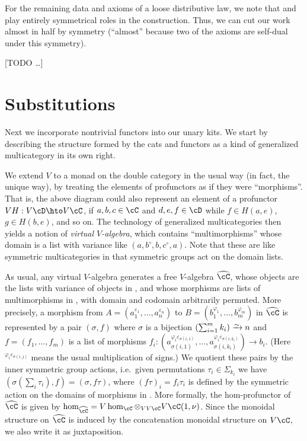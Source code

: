 \documentclass{amsart}
\newcommand{\C}{\cC}
\newcommand{\D}{\cD}
\renewcommand{\Chat}{\ensuremath{\widehat{\C}}\xspace}
\newcommand{\Tmult}{\nu}
\renewcommand{\o}{^{\circ}}
\newcommand{\e}[1][]{^{\varepsilon_{#1}}}
\renewcommand{\ph}[1][]{^{\varphi_{#1}}}
\newcommand{\phe}[2]{^{\varphi_{#1}\varepsilon_{#2}}}
\begin{document}
For the remaining data and axioms of a loose distributive law, we note that \dT and \dS play entirely symmetrical roles in the construction.
Thus, we can cut our work almost in half by symmetry (``almost'' because two of the axioms are self-dual under this symmetry).

[TODO \dots]


\section{Substitutions}
\label{sec:substitutions}

Next we incorporate nontrivial functors into our unary kits.
We start by describing the structure formed by the cats and functors as a kind of generalized multicategory in its own right.

We extend $V$ to a monad on the double category \dCat in the usual way (in fact, the unique way), by treating the elements of profunctors as if they were ``morphisms''.
That is, the above diagram could also represent an element of a profunctor $V H : V \D \hto V \C$, if $a,b,c\in\C$ and $d,e,f\in \D$ while $f\in H(a,e)$, $g\in H(b,e)$, and so on.
The technology of generalized multicategories then yields a notion of \emph{virtual $V$-algebra}, which contains ``multimorphisms'' whose domain is a list with variance like $(a,b\o,b,c\o,a)$.
Note that these are like symmetric multicategories in that symmetric groups act on the domain lists.

As usual, any virtual $V$-algebra \C generates a free $V$-algebra \Chat, whose objects are the lists with variance of objects in \C, and whose morphisms are lists of multimorphisms in \C, with domain and codomain arbitrarily permuted.
More precisely, a morphism from $A=(a_1\e[1],\dots,a_n\e[n])$ to $B=(b_1\ph[1],\dots,b_m\ph[m])$ in \Chat is represented by a pair $(\sigma,f)$ where $\sigma$ is a bijection $\left(\sum_{i=1}^m k_i\right) \toiso n$ and $f=(f_1,\dots,f_m)$ is a list of morphisms $f_i:(a_{\sigma(i,1)}\phe{i}{\sigma(i,1)},\dots,a_{\sigma(i,k_i)}\phe{i}{\sigma(i,k_i)}) \to b_i$.
(Here $\phe{i}{\sigma(i,j)}$ means the usual multiplication of signs.)
We quotient these pairs by the inner symmetric group actions, i.e.\ given permutations $\tau_i\in\Sigma_{k_i}$ we have $(\sigma(\sum_i \tau_i), f) = (\sigma,f\tau)$, where $(f\tau)_i = f_i \tau_i$ is defined by the symmetric action on the domains of morphisms in \C.
More formally, the hom-profunctor of \Chat is given by $\hom_{\Chat} = V\hom_\C \otimes_{VV\C} V\C(1,\Tmult)$.
Since the monoidal structure on \Chat is induced by the concatenation monoidal structure on $V\C$, we also write it as juxtaposition.
\end{document}
